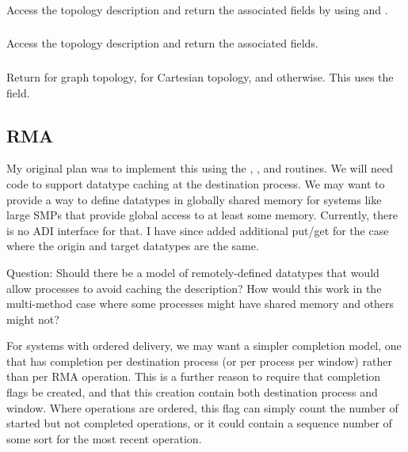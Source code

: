\documentclass{article}
\begin{document}
\subsubsection{}
Access the topology description and return the associated fields by using
 and .

\subsubsection{}
Access the topology description and return the associated fields.

\subsubsection{}
Return  for graph topology,  for
Cartesian topology, and  otherwise.  This uses the
 field.

\subsection{RMA}
\label{sec:rma}
My original plan was to implement this using the ,
,  and  routines.  We
will need code to support datatype caching at the destination process.
We may want to provide a way to define datatypes in globally shared
memory for systems like large SMPs that provide global access to at
least some memory.  Currently, there is no ADI interface for that.
I have since added additional put/get for the case where the origin
and target datatypes are the same.  

Question:  Should there be a model of remotely-defined datatypes that
would allow processes to avoid caching the description?  How would
this work in the multi-method case where some processes might have
shared memory and others might not?

For systems with ordered delivery, we may want a simpler completion
model, one that has completion per destination process (or per process
per window) rather than per RMA operation.  This is a further reason
to require that completion flags be created, and that this creation
contain both destination process and window.  Where operations are
ordered, this flag can simply count the number of started but not
completed operations, or it could contain a sequence number of some
sort for the most recent operation.  
\end{document}
